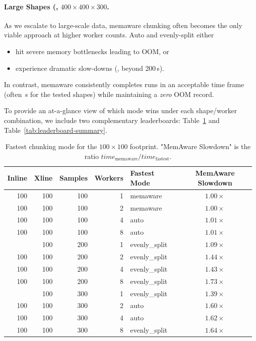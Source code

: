 \paragraph{Large Shapes (\eg, \(400 \times 400 \times 300\).}
As we escalate to large-scale data, memaware chunking often becomes the only viable approach at higher worker counts.
Auto and evenly-split either
\begin{itemize}
    \item hit severe memory bottlenecks leading to \ac{OOM}, or
    \item experience dramatic slow-downs (\eg, beyond 200\,s).
\end{itemize}
In contrast, memaware consistently completes runs in an acceptable time frame (often \,s for the tested shapes) while maintaining a \emph{zero} \ac{OOM} record.

\medskip
\noindent
To provide an at-a-glance view of which mode wins under each shape/worker combination, we include two complementary leaderboards: Table~\ref{tab:leaderboard-100-100} and Table~\ref{tab:leaderboard-summary}.

\begin{table}[ht]
    \centering
    \caption{Fastest chunking mode for the $100\times100$ footprint.
    "MemAware Slowdown" is the ratio
        $\textit{time}_{\text{memaware}}/\textit{time}_{\text{fastest}}$.}
    \label{tab:leaderboard-100-100}
    \begin{tabular}{rrrrlc}
        \toprule
        \textbf{Inline} & \textbf{Xline} & \textbf{Samples} &
        \textbf{Workers} & \textbf{Fastest Mode} & \textbf{MemAware Slowdown} \\
        \midrule
        100 & 100 & 100 & 1 & memaware      & $1.00\times$ \\
        100 & 100 & 100 & 2 & memaware      & $1.00\times$ \\
        100 & 100 & 100 & 4 & auto          & $1.01\times$ \\
        100 & 100 & 100 & 8 & auto          & $1.01\times$ \\
        \addlinespace
        100 & 100 & 200 & 1 & evenly\_split & $1.09\times$ \\
        100 & 100 & 200 & 2 & evenly\_split & $1.44\times$ \\
        100 & 100 & 200 & 4 & evenly\_split & $1.43\times$ \\
        100 & 100 & 200 & 8 & evenly\_split & $1.73\times$ \\
        \addlinespace
        100 & 100 & 300 & 1 & evenly\_split & $1.39\times$ \\
        100 & 100 & 300 & 2 & auto          & $1.60\times$ \\
        100 & 100 & 300 & 4 & auto          & $1.62\times$ \\
        100 & 100 & 300 & 8 & evenly\_split & $1.64\times$ \\
        \bottomrule
    \end{tabular}
\end{table}

